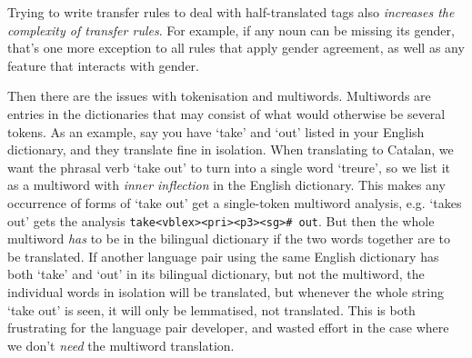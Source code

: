 \documentclass[10pt, a4paper]{article}
\newcommand{\ana}[1]{\texttt{#1}}
\newcommand{\f}[1]{`#1'}
\begin{document}
Trying to write transfer rules to deal with half-translated tags also
\emph{increases the complexity of transfer rules}. For example, if any
noun can be missing its gender, that's one more exception to all rules
that apply gender agreement, as well as any feature that interacts
with gender.

Then there are the issues with tokenisation and multiwords. Multiwords
are entries in the dictionaries that may consist of what would
otherwise be several tokens. As an example, say you have \f{take} and
\f{out} listed in your English dictionary, and they translate fine in
isolation. When translating to Catalan, we want the phrasal verb
\f{take out} to turn into a single word \f{treure}, so we list it as a
multiword with \emph{inner inflection} in the English dictionary. This
makes any occurrence of forms of \f{take out} get a single-token
multiword analysis, e.g. \f{takes out} gets the analysis
\ana{take<vblex><pri><p3><sg>\# out}. But then the whole multiword
\emph{has} to be in the bilingual dictionary if the two words together
are to be translated. If another language pair using the same English
dictionary has both \f{take} and \f{out} in its bilingual dictionary,
but not the multiword, the individual words in isolation will be
translated, but whenever the whole string \f{take out} is seen, it
will only be lemmatised, not translated. This is both frustrating for
the language pair developer, and wasted effort in the case where we
don't \emph{need} the multiword translation.
\end{document}
